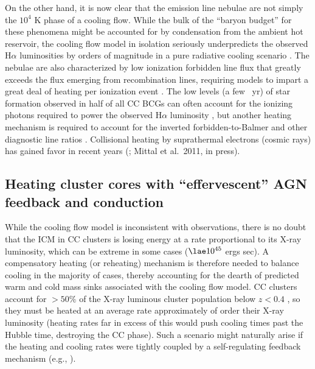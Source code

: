 On the  other hand, it is now clear that the emission line nebulae 
are not simply the $10^4$ K phase of a cooling flow. 
While the bulk of the ``baryon budget'' for  these phenomena
might be accounted for by condensation from the ambient hot reservoir, 
the cooling flow model in isolation 
seriously underpredicts the observed H$\alpha$ luminosities by orders of magnitude
in a pure radiative cooling scenario \citep[e.g.,][]{heckman89,voit97}. 
The nebulae are also
characterized  by  low ionization  forbidden  line  flux that  greatly
exceeds the flux emerging from recombination lines, requiring 
models to impart a great deal of heating per ionization event \citep{donahue91,voit97}. 
The low levels (a few \Msol\ yr\mone) of star formation observed in half of all CC BCGs
can often account for the ionizing photons required to power the observed H$\alpha$ luminosity \citep[e.g.,][]{bildfell08,odea08,odea10,mcdonald10,mcdonald11}, but another heating mechanism is required to account for the inverted forbidden-to-Balmer and other diagnostic line ratios \citep[e.g.,][]{voit97}. Collisional heating by suprathermal electrons (cosmic rays) has gained 
favor in recent years (\citealt{ferland09,donahue11,fabian11}; Mittal et al.~2011, in press). 



\subsection{Heating cluster cores with ``effervescent'' AGN feedback and 
conduction}


While the cooling flow model is inconsistent with observations, there  is no doubt that  the ICM in CC  clusters is losing
energy at  a rate proportional to  its X-ray luminosity,  which can be
extreme in some cases  ($\lae 10^{45}$ ergs sec\mone).  A compensatory
heating  (or  reheating)  mechanism  is therefore  needed  to  balance
cooling in the majority of cases,  thereby accounting  for the  dearth of  predicted warm and cold mass
sinks  associated with  the  cooling flow model.   CC  clusters account  for
$>50\%$  of  the  X-ray  luminous  cluster  population  below  $z<0.4$
\citep[e.g.,][]{mcnamara07},  so  they  must  be  heated  at  an  average  rate
approximately of  order their X-ray  luminosity (heating rates  far in
excess  of  this  would  push  cooling times  past  the  Hubble  time,
destroying the  CC phase).  Such  a scenario might naturally  arise if
the   heating  and   cooling   rates  were   tightly   coupled  by   a
self-regulating feedback mechanism (e.g., \citealt{begelman01,ruszkowski02,churazov02,reynolds02,birzan04}).


